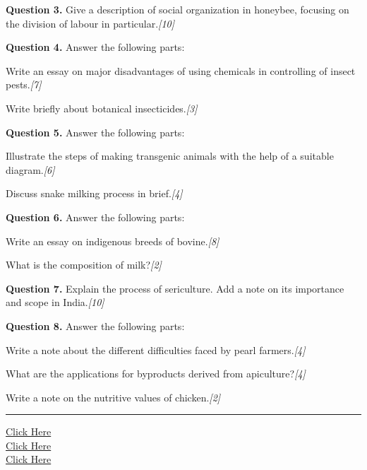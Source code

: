 \documentclass[11pt,a4paper]{article}
\newcommand{\pts}[1]{\hfill   \textit{[#1]}}
\begin{document}
\medskip


\noindent   \textbf{Question 3.} Give a description of social organization in honeybee, focusing on the division of labour in particular.\pts{10}

\medskip


\noindent   \textbf{Question 4.} Answer the following parts:

\begin{parts}
  \item Write an essay on major disadvantages of using chemicals in controlling of insect pests.\pts{7}
  \item Write briefly about botanical insecticides.\pts{3}
\end{parts}

\medskip


\noindent   \textbf{Question 5.} Answer the following parts:

\begin{parts}
  \item Illustrate the steps of making transgenic animals with the help of a suitable diagram.\pts{6}
  \item Discuss snake milking process in brief.\pts{4}
\end{parts}

\medskip


\noindent   \textbf{Question 6.} Answer the following parts:

\begin{parts}
  \item Write an essay on indigenous breeds of bovine.\pts{8}
  \item What is the composition of milk?\pts{2}
\end{parts}

\medskip


\noindent   \textbf{Question 7.} Explain the process of sericulture. Add a note on its importance and scope in India.\pts{10}

\medskip


\noindent   \textbf{Question 8.} Answer the following parts:

\begin{parts}
  \item Write a note about the different difficulties faced by pearl farmers.\pts{4}
  \item What are the applications for byproducts derived from apiculture?\pts{4}
  \item Write a note on the nutritive values of chicken.\pts{2}
\end{parts}

\vfill
\rule{\linewidth}{0.4pt}

\begin{center}\small
\href{https://bhu-exam.vercel.app/}{Click Here}\\[4pt]\href{https://me-aryan.vercel.app/}{Click Here}\\[4pt]\href{https://quashan-me.vercel.app/}{Click Here}
\end{center}
\end{document}
